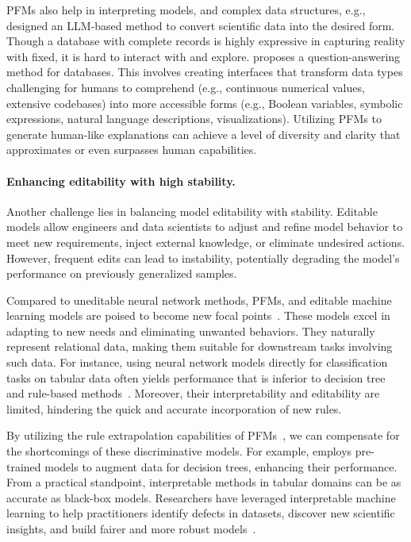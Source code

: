   PFMs also help in interpreting models, and complex data structures, e.g., \cite{ko2024filling} designed an LLM-based method to convert scientific data into the desired form. Though a database with complete records is highly expressive in capturing reality with fixed, it is hard to interact with and explore. \cite{zheng2024revolutionizing} proposes a question-answering method for databases. This involves creating interfaces that transform data types challenging for humans to comprehend (e.g., continuous numerical values, extensive codebases) into more accessible forms (e.g., Boolean variables, symbolic expressions, natural language descriptions, visualizations). Utilizing PFMs to generate human-like explanations can achieve a level of diversity and clarity that approximates or even surpasses human capabilities.
  
  \paragraph{Enhancing editability with high stability.}
  
  Another challenge lies in balancing model editability with stability. Editable models allow engineers and data scientists to adjust and refine model behavior to meet new requirements, inject external knowledge, or eliminate undesired actions. However, frequent edits can lead to instability, potentially degrading the model's performance on previously generalized samples.
  
  Compared to uneditable neural network methods, PFMs, and editable machine learning models are poised to become new focal points~\cite{vojivr2020editable}. These models excel in adapting to new needs and eliminating unwanted behaviors. They naturally represent relational data, making them suitable for downstream tasks involving such data. For instance, using neural network models directly for classification tasks on tabular data often yields performance that is inferior to decision tree and rule-based methods~\cite{popov2019neural,grinsztajn2022tree}. Moreover, their interpretability and editability are limited, hindering the quick and accurate incorporation of new rules.
  
  By utilizing the rule extrapolation capabilities of PFMs~\cite{reizingerposition}, we can compensate for the shortcomings of these discriminative models. For example, \cite{nam2024optimized} employs pre-trained models to augment data for decision trees, enhancing their performance. From a practical standpoint, interpretable methods in tabular domains can be as accurate as black-box models. Researchers have leveraged interpretable machine learning to help practitioners identify defects in datasets, discover new scientific insights, and build fairer and more robust models~\cite{caruana2022data}.
  
